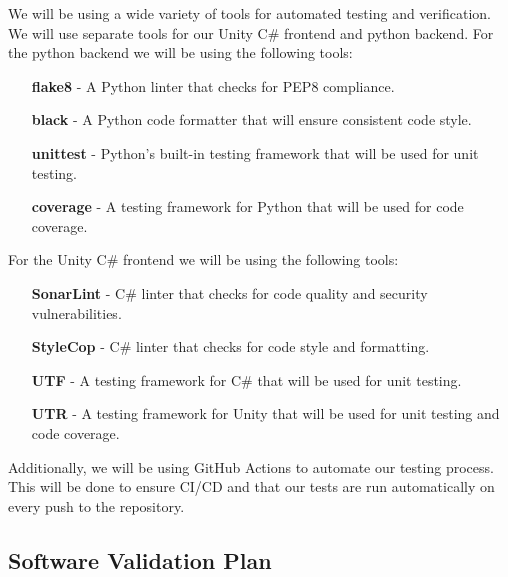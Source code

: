 \documentclass[12pt, titlepage]{article}
\begin{document}
  \noindent We will be using a wide variety of tools for automated testing and verification.
  We will use separate tools for our Unity C\# frontend and python backend.
  \bigskip
  \newline
  For the python backend we will be using the following tools:
  \begin{itemize}
    \item [\textbf{flake8}] - A Python linter that checks for PEP8 compliance.
    \item [\textbf{black}] - A Python code formatter that will ensure consistent code style.
    \item [\textbf{unittest}] - Python's built-in testing framework that will be used for unit testing.
    \item [\textbf{coverage}] - A testing framework for Python that will be used for code coverage.
  \end{itemize}

  \bigskip
  \noindent For the Unity C\# frontend we will be using the following tools:
  \begin{itemize}
    \item [\textbf{SonarLint}] - C\# linter that checks for code quality and security vulnerabilities.
    \item [\textbf{StyleCop}] - C\# linter that checks for code style and formatting.
    \item [\textbf{UTF}] - A testing framework for C\# that will be used for unit testing.
    \item [\textbf{UTR}] - A testing framework for Unity that will be used for unit testing and code coverage.
  \end{itemize}

  \noindent Additionally, we will be using GitHub Actions to automate our testing process.
  This will be done to ensure CI/CD and that our tests are run automatically on every push to the repository.



\subsection{Software Validation Plan}

\end{document}
